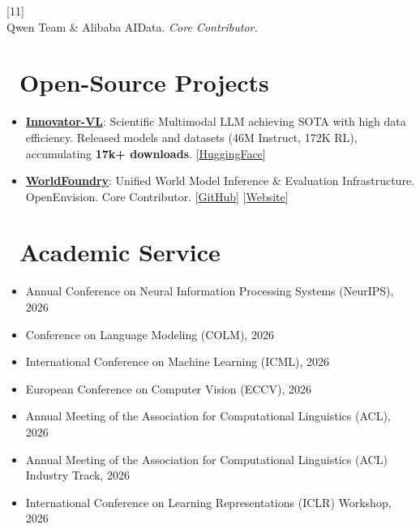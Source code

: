 \documentclass{resume}
\begin{document}
 \hfill [11]\\
Qwen Team \& Alibaba AIData. \textit{Core Contributor.} \\


\section{\faCodeFork\ Open-Source Projects}
\begin{itemize}[parsep=0.5ex]
  \item \href{https://huggingface.co/InnovatorLab}{\textbf{Innovator-VL}}: Scientific Multimodal LLM achieving SOTA with high data efficiency. Released models and datasets (46M Instruct, 172K RL), accumulating \textbf{17k+ downloads}. [\href{https://huggingface.co/InnovatorLab}{HuggingFace}]
  \item \href{https://github.com/OpenEnvision/WorldFoundry}{\textbf{WorldFoundry}}: Unified World Model Inference \& Evaluation Infrastructure. OpenEnvision. Core Contributor. [\href{https://github.com/OpenEnvision/WorldFoundry}{GitHub}] [\href{https://openenvision.github.io/}{Website}]
\end{itemize}


\section{\faTasks\ Academic Service}
\begin{itemize}[parsep=0.5ex]
    \item Annual Conference on Neural Information Processing Systems (NeurIPS), 2026
    \item Conference on Language Modeling (COLM), 2026
    \item International Conference on Machine Learning (ICML), 2026
    \item European Conference on Computer Vision (ECCV), 2026
    \item Annual Meeting of the Association for Computational Linguistics (ACL), 2026
    \item Annual Meeting of the Association for Computational Linguistics (ACL) Industry Track, 2026
    \item International Conference on Learning Representations (ICLR) Workshop, 2026
\end{itemize}
\end{document}
